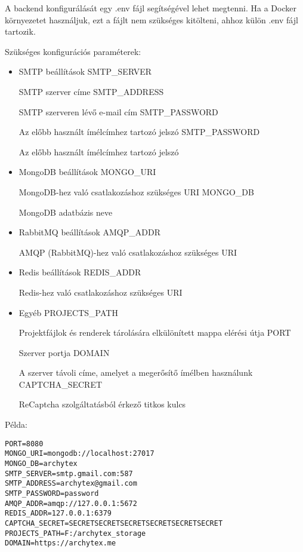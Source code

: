 A backend konfigurálását egy .env fájl segítségével lehet megtenni. Ha a Docker környezetet használjuk, ezt a fájlt nem szükséges kitölteni, ahhoz külön .env fájl tartozik.

Szükséges konfigurációs paraméterek:
\begin{itemize}
      \item SMTP beállítások
            \subitem SMTP\_SERVER

            SMTP szerver címe
            \subitem SMTP\_ADDRESS

            SMTP szerveren lévő e-mail cím
            \subitem SMTP\_PASSWORD

            Az előbb használt ímélcímhez tartozó jelszó
            \subitem SMTP\_PASSWORD

            Az előbb használt ímélcímhez tartozó jelszó
      \item MongoDB beállítások
            \subitem MONGO\_URI

            MongoDB-hez való csatlakozáshoz szükséges URI
            \subitem MONGO\_DB

            MongoDB adatbázis neve
      \item RabbitMQ beállítások
            \subitem AMQP\_ADDR

            AMQP (RabbitMQ)-hez való csatlakozáshoz szükséges URI
      \item Redis beállítások
            \subitem REDIS\_ADDR

            Redis-hez való csatlakozáshoz szükséges URI
      \item Egyéb
            \subitem PROJECTS\_PATH

            Projektfájlok és renderek tárolására elkülönített mappa elérési útja
            \subitem PORT

            Szerver portja
            \subitem DOMAIN

            A szerver távoli címe, amelyet a megerősítő ímélben használunk
            \subitem CAPTCHA\_SECRET

            ReCaptcha szolgáltatásból érkező titkos kulcs
\end{itemize}

Példa:

\begin{lstlisting}
PORT=8080
MONGO_URI=mongodb://localhost:27017
MONGO_DB=archytex
SMTP_SERVER=smtp.gmail.com:587
SMTP_ADDRESS=archytex@gmail.com
SMTP_PASSWORD=password
AMQP_ADDR=amqp://127.0.0.1:5672
REDIS_ADDR=127.0.0.1:6379
CAPTCHA_SECRET=SECRETSECRETSECRETSECRETSECRETSECRET
PROJECTS_PATH=F:/archytex_storage
DOMAIN=https://archytex.me
\end{lstlisting}

